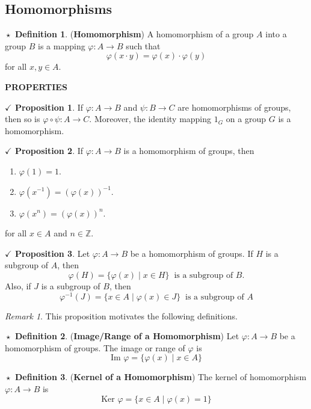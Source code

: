 \documentclass{article}
\theoremstyle{definition}
\newtheorem{definition}{$\boxed{\star}$ Definition}
\theoremstyle{remark}
\newtheorem*{remark}{Remark}
\theoremstyle{definition}
\theoremstyle{definition}
\newtheorem{proposition}{$\checkmark$ Proposition}
\theoremstyle{definition}
\theoremstyle{proof}
\newcommand{\inv}[1]{#1^{-1}}
\newcommand{\image}[0]{\text{Im }}
\newcommand{\kernel}[0]{\text{Ker }}
\begin{document}
\subsection{Homomorphisms}
\begin{definition}
	(\textbf{Homomorphism}) A homomorphism of a group $ A $ into a group $ B $ is a mapping $ \varphi : A \longrightarrow B$ such that
	\[\varphi(x\cdot y) = \varphi(x)\cdot \varphi(y)\]
	for all $ x,y \in A $.
\end{definition}
\hrulefill
\textbf{PROPERTIES}
\hrulefill
\begin{proposition}
	If $ \varphi : A \to B $ and $ \psi : B\to C $ are homomorphisms of groups, then so is $ \varphi \circ \psi : A \to C $.	Moreover, the identity mapping $ 1_G $ on a group $ G $ is a homomorphism.
\end{proposition}
\hrulefill
\begin{proposition}
	If $ \varphi : A \to B $ is a homomorphism of groups, then
	\begin{enumerate}
		\item{$ \varphi(1) = 1 $.}
		\item{$ \varphi(\inv{x}) = \inv{(\varphi(x))}$.}
		\item{$ \varphi(x^n) = (\varphi(x))^n $.}
	\end{enumerate}
for all $ x\in A $ and $ n\in \mathbb{Z} $.
\end{proposition}
\hrulefill
\begin{proposition}
	Let $ \varphi : A\to B $ be a homomorphism of groups. If $ H $ is a subgroup of $ A $, then 
	\[\varphi(H) = \{\varphi(x) \;\vert\; x\in H\}\;\;\text{is a subgroup of }B .\]
	Also, if $ J $ is a subgroup of $ B $, then
	\[\varphi^{-1}(J) = \{x\in A\;\vert\; \varphi(x)\in J\}\;\;\text{is a subgroup of }A\]
\end{proposition}
\begin{remark}
	This proposition motivates the following definitions.
\end{remark}
\hrulefill
\begin{definition}
	(\textbf{Image/Range of a Homomorphism}) Let $ \varphi : A\to B$ be a homomorphism of groups. The image or range of $ \varphi $ is 
	\[\image \varphi = \{\varphi(x) \;\vert\; x\in A\}\]
\end{definition}
\begin{definition}
	(\textbf{Kernel of a Homomorphism}) The kernel of homomorphism $ \varphi : A\to B$
 is 
 \[\kernel \varphi = \{x \in A\;\vert\; \varphi(x) = 1\}\]
\end{definition}
\end{document}
